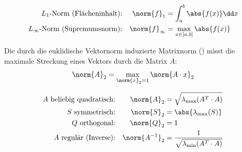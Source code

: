 \begin{formulabox}[Spezialfälle]
  \[
  \begin{aligned}
    L_1\text{-Norm (Flächeninhalt):} && \norm{f}_1 &= \int_{a}^{b} \abs{f(x)} \dd x \\
    L_\infty\text{-Norm (Supremumsnorm):} && \norm{f}_\infty &= \max_{x \in [a,b]} \abs{f(x)}
  \end{aligned}
  \]
\end{formulabox}


\begin{defbox}[Matrixnorm]
Die durch die euklidische Vektornorm induzierte Matrixnorm () misst die maximale Streckung eines Vektors durch die Matrix $A$:
\[ \norm{A}_2 = \max_{\norm{x}_2 = 1} \norm{A \cdot x}_2 \]
\end{defbox}

\begin{formulabox}
  \[
  \begin{aligned}
    A \text{ beliebig quadratisch:} && \norm{A}_2 &= \sqrt{\lambda_{\max}(A^T \cdot A)} \\
    S \text{ symmetrisch:} && \norm{S}_2 &= \abs{\lambda_{\max}(S)} \\
    Q \text{ orthogonal:} && \norm{Q}_2 &= 1 \\
    A \text{ regulär (Inverse):} && \norm{A^{-1}}_2 &= \frac{1}{\sqrt{\lambda_{\min}(A^T \cdot A)}}
  \end{aligned}
  \]
\end{formulabox}
